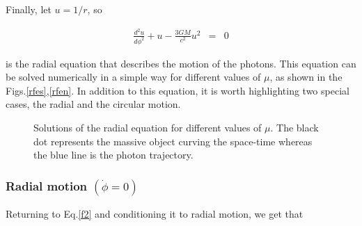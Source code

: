 \documentclass[letterpaper,11pt,onecolumn]{article}
\begin{document}
Finally, let $u=1/r$, so 

\begin{eqnarray}
    \frac{d^{2}u}{d\phi^{2}}+u-\frac{3GM}{c^{2}}u^{2}&=&0 \label{fr}
\end{eqnarray}

is the radial equation that describes the motion of the photons. This equation can be solved numerically in a simple way for different values of $\mu$, as shown in the Figs.\ref{rfes},\ref{rfen}. In addition to this equation, it is worth highlighting two special cases, the radial  and the circular motion. 

\begin{figure}[h!]
\centering
{}
\caption{Solutions of the radial equation for different values of $\mu$. The black dot represents the massive object curving the space-time whereas the blue line is the photon trajectory.}
\end{figure}

\subsubsection{Radial motion $(\dot{\phi}=0)$}

Returning to Eq.\ref{f2} and conditioning it to radial motion, we get that
\end{document}
